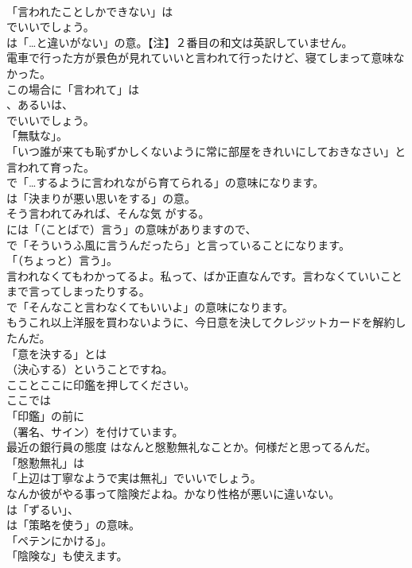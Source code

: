 \documentclass[8pt]{extreport}
\begin{document}
\begin{CJK}{UTF8}{min}
\\	「言われたことしかできない」は 
\\	でいいでしょう。
\\	は「…と違いがない」の意。【注】２番目の和文は英訳していません。	
\\	電車で行った方が景色が見れていいと言われて行ったけど、寝てしまって意味なかった。 
\\	この場合に「言われて」は
\\	、あるいは、
\\	でいいでしょう。
\\	「無駄な」。	
\\	「いつ誰が来ても恥ずかしくないように常に部屋をきれいにしておきなさい」と言われて育った。 
\\	で「…するように言われながら育てられる」の意味になります。
\\	は「決まりが悪い思いをする」の意。	
\\	そう言われてみれば、そんな気 がする。 
\\	には「（ことばで）言う」の意味がありますので、
\\	で「そういうふ風に言うんだったら」と言っていることになります。
\\	「（ちょっと）言う」。	
\\	言われなくてもわかってるよ。私って、ばか正直なんです。言わなくていいことまで言ってしまったりする。 
\\	で「そんなこと言わなくてもいいよ」の意味になります。	
\\	もうこれ以上洋服を買わないように、今日意を決してクレジットカードを解約したんだ。 
\\	「意を決する」とは 
\\	（決心する）ということですね。	
\\	こことここに印鑑を押してください。 
\\	ここでは
\\	「印鑑」の前に
\\	（署名、サイン）を付けています。	
\\	最近の銀行員の態度 はなんと慇懃無礼なことか。何様だと思ってるんだ。 
\\	「慇懃無礼」は
\\	「上辺は丁寧なようで実は無礼」でいいでしょう。	
\\	なんか彼がやる事って陰険だよね。かなり性格が悪いに違いない。 
\\	は「ずるい」、
\\	は「策略を使う」の意味。
\\	「ペテンにかける」。
\\	「陰険な」も使えます。	

\end{CJK}
\end{document}

